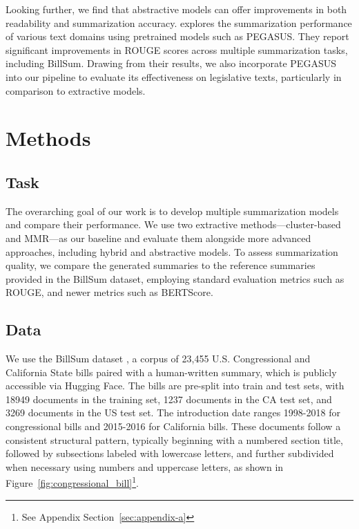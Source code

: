 \documentclass[11pt]{article}
\begin{document}
\indent Looking further, we find that abstractive models can offer improvements in both readability and summarization accuracy. \citet{pmlr-v119-zhang20ae} explores the summarization performance of various text domains using pretrained models such as PEGASUS. They report significant improvements in ROUGE scores across multiple summarization tasks, including BillSum. Drawing from their results, we also incorporate PEGASUS into our pipeline to evaluate its effectiveness on legislative texts, particularly in comparison to extractive models.

\section{Methods}

\subsection{Task}

The overarching goal of our work is to develop multiple summarization models and compare their performance. We use two extractive methods—cluster-based and MMR—as our baseline and evaluate them alongside more advanced approaches, including hybrid and abstractive models. To assess summarization quality, we compare the generated summaries to the reference summaries provided in the BillSum dataset, employing standard evaluation metrics such as ROUGE, and newer metrics such as BERTScore. 

\subsection{Data}

We use the BillSum dataset \citep{Eidelman_2019}, a corpus of 23,455 U.S. Congressional and California State bills paired with a human-written summary, which is publicly accessible via Hugging Face. The bills are pre-split into train and test sets, with 18949 documents in the training set, 1237 documents in the CA test set, and 3269 documents in the US test set. The introduction date ranges 1998-2018 for congressional bills and 2015-2016 for California bills. These documents follow a consistent structural pattern, typically beginning with a numbered section title, followed by subsections labeled with lowercase letters, and further subdivided when necessary using numbers and uppercase letters, as shown in Figure~\ref{fig:congressional_bill}\footnote{See Appendix Section~\ref{sec:appendix-a}}. 
\end{document}
